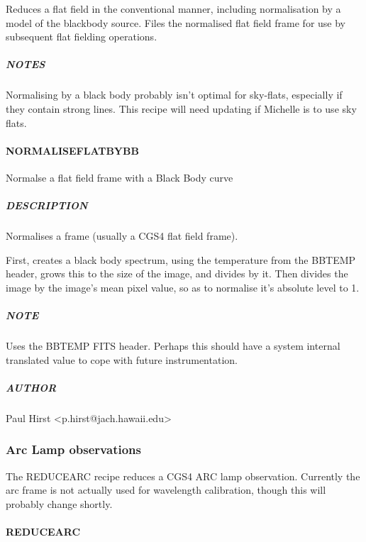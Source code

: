 \documentclass[twoside,11pt]{article}
\renewcommand{\_}{\texttt{\symbol{95}}}
\begin{document}
Reduces a flat field in the conventional manner, including
normalisation by a model of the blackbody source. Files the normalised
flat field frame for use by subsequent flat fielding operations.

\subparagraph*{NOTES\label{REDUCE_FLAT_NOTES}}

Normalising by a black body probably isn't optimal for sky-flats,
especially if they contain strong lines.
This recipe will need updating if Michelle is to use sky flats.


\paragraph*{\_NORMALISE\_FLAT\_BY\_BB\_\label{_NORMALISE_FLAT_BY_BB_}}

Normalse a flat field frame with a Black Body curve

\subparagraph*{DESCRIPTION\label{_NORMALISE_FLAT_BY_BB__DESCRIPTION}}

Normalises a frame (usually a CGS4 flat field frame).



First, creates a black body spectrum, using the temperature from the
BBTEMP header, grows this to the size of the image, and divides by
it. Then divides the image by the image's mean pixel value, so as to
normalise it's absolute level to 1.

\subparagraph*{NOTE\label{_NORMALISE_FLAT_BY_BB__NOTE}}

Uses the BBTEMP FITS header. Perhaps this should have a system internal
translated value to cope with future instrumentation.

\subparagraph*{AUTHOR\label{_NORMALISE_FLAT_BY_BB__AUTHOR}}

Paul Hirst <p.hirst@jach.hawaii.edu>


\subsubsection{Arc Lamp observations}

The REDUCE\_ARC recipe reduces a CGS4 ARC lamp observation. Currently
the arc frame is not actually used for wavelength calibration, though
this will probably change shortly.

\paragraph*{REDUCE\_ARC\label{REDUCE_ARC}}
\end{document}
